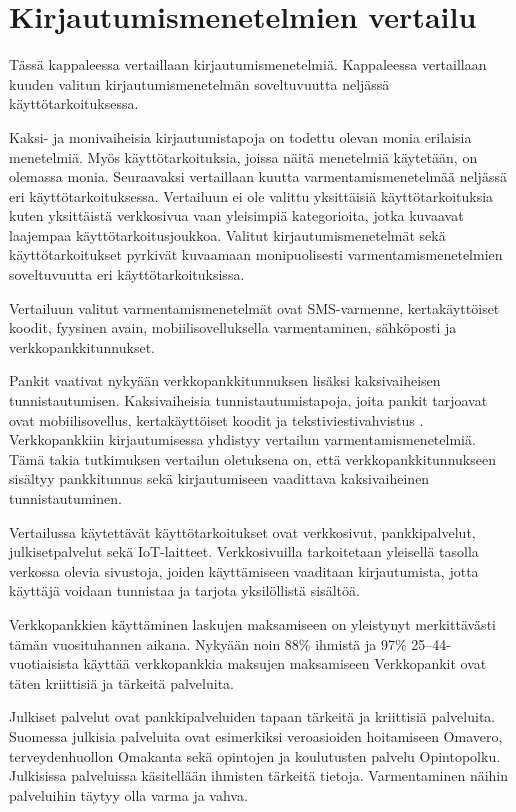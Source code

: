 \chapter{Kirjautumismenetelmien vertailu\label{vertailu}}

Tässä kappaleessa vertaillaan kirjautumismenetelmiä. Kappaleessa vertaillaan kuuden valitun kirjautumismenetelmän soveltuvuutta neljässä käyttötarkoituksessa. 


Kaksi- ja monivaiheisia kirjautumistapoja on todettu olevan monia erilaisia menetelmiä. Myös käyttötarkoituksia, joissa näitä menetelmiä käytetään, on olemassa monia. Seuraavaksi vertaillaan kuutta varmentamismenetelmää neljässä eri käyttötarkoituksessa. Vertailuun ei ole valittu yksittäisiä käyttötarkoituksia kuten yksittäistä verkkosivua vaan yleisimpiä kategorioita, jotka kuvaavat laajempaa käyttötarkoitusjoukkoa. Valitut kirjautumismenetelmät sekä käyttötarkoitukset pyrkivät kuvaamaan monipuolisesti varmentamismenetelmien soveltuvuutta eri käyttötarkoituksissa. 

Vertailuun valitut varmentamismenetelmät ovat SMS-varmenne, kertakäyttöiset koodit, fyysinen avain, mobiilisovelluksella varmentaminen, sähköposti ja verkkopankkitunnukset.

Pankit vaativat nykyään verkkopankkitunnuksen lisäksi kaksivaiheisen tunnistautumisen. Kaksivaiheisia tunnistautumistapoja, joita pankit tarjoavat ovat mobiilisovellus, kertakäyttöiset koodit ja tekstiviestivahvistus \citep{nordea_tunnistautuminen} \citep{op_tunnistautuminen} \citep{spankki_tunnistautuminen}. Verkkopankkiin kirjautumisessa yhdistyy vertailun varmentamismenetelmiä. Tämä takia tutkimuksen vertailun oletuksena on, että verkkopankkitunnukseen sisältyy pankkitunnus sekä kirjautumiseen vaadittava kaksivaiheinen tunnistautuminen.

Vertailussa käytettävät käyttötarkoitukset ovat verkkosivut, pankkipalvelut, julkisetpalvelut sekä IoT-laitteet. Verkkosivuilla tarkoitetaan yleisellä tasolla verkossa olevia sivustoja, joiden käyttämiseen vaaditaan kirjautumista, jotta käyttäjä voidaan tunnistaa ja tarjota yksilöllistä sisältöä. 

Verkkopankkien käyttäminen laskujen maksamiseen on yleistynyt merkittävästi tämän vuosituhannen aikana. Nykyään noin 88\% ihmistä ja 97\% 25–44-vuotiaisista käyttää verkkopankkia maksujen maksamiseen \citep{säästäminen_luotonkäyttö_maksutavat} Verkkopankit ovat täten kriittisiä ja tärkeitä palveluita.

Julkiset palvelut ovat pankkipalveluiden tapaan tärkeitä ja kriittisiä palveluita. Suomessa julkisia palveluita ovat esimerkiksi veroasioiden hoitamiseen Omavero, terveydenhuollon Omakanta sekä opintojen ja koulutusten palvelu Opintopolku. Julkisissa palveluissa käsitellään ihmisten tärkeitä tietoja. Varmentaminen näihin palveluihin täytyy olla varma ja vahva.

